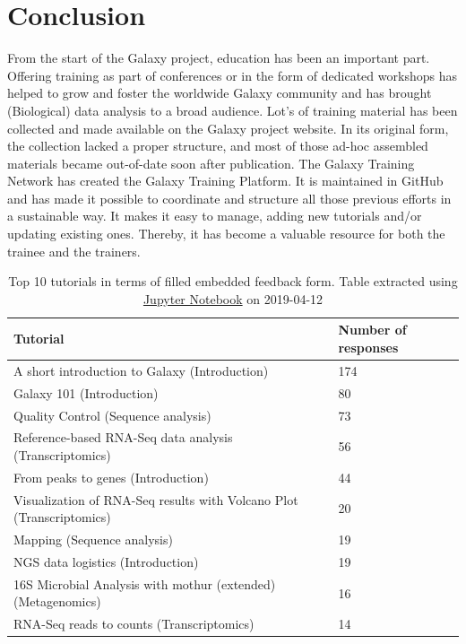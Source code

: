 \documentclass[10pt,letterpaper]{article}
\begin{document}
\section*{Conclusion}
From the start of the Galaxy project, education has been an important part. Offering training as part of conferences or in the form of dedicated workshops has helped to grow and foster the worldwide Galaxy community and has brought (Biological) data analysis to a broad audience. Lot's of training material has been collected and made available on the Galaxy project website. In its original form, the collection lacked a proper structure, and most of those ad-hoc assembled materials became out-of-date soon after publication.
The Galaxy Training Network has created the Galaxy Training Platform. It is maintained in GitHub and has made it possible to coordinate and structure all those previous efforts in a sustainable way. It makes it easy to manage, adding new tutorials and/or updating existing ones. Thereby, it has become a valuable resource for both the trainee and the trainers.




\begin{table}[]
	\centering
	\caption{Top 10 tutorials in terms of filled embedded feedback form. Table extracted using \href{https://github.com/bebatut/galaxy-training-material-stats/blob/master/src/extract_repo_content_stats.ipynb}{Jupyter Notebook} on 2019-04-12\label{tbl:toptentutorials}}
	\begin{tabular}{p{}p{}}
		Tutorial                                                             & Number of responses \\\hline
		A short introduction to Galaxy (Introduction)                        & 174 \\
		Galaxy 101 (Introduction)                                            & 80 \\
		Quality Control (Sequence analysis)                                  & 73 \\
		Reference-based RNA-Seq data analysis (Transcriptomics)              & 56 \\
		From peaks to genes (Introduction)                                   & 44 \\
		Visualization of RNA-Seq results with Volcano Plot (Transcriptomics) & 20 \\
		Mapping (Sequence analysis)                                          & 19 \\
		NGS data logistics (Introduction)                                    & 19 \\
		16S Microbial Analysis with mothur (extended) (Metagenomics)         & 16 \\
		RNA-Seq reads to counts (Transcriptomics)                            & 14
	\end{tabular}
\end{table}
\end{document}
